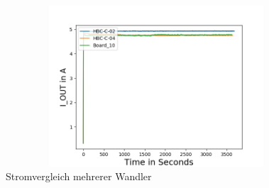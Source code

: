 \begin{figure}
    \centering
    \includegraphics[height= 6cm, width = 12cm]{Pictures/Comp_IOUT.png}
    \caption{Stromvergleich mehrerer Wandler}
\end{figure}

